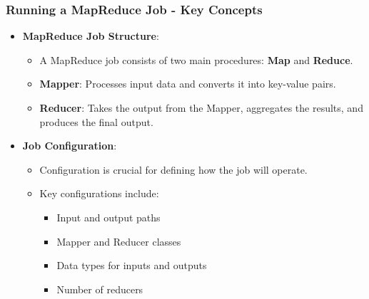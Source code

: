\documentclass[aspectratio=169]{beamer}
\begin{document}
\begin{frame}[fragile]
    \frametitle{Running a MapReduce Job - Key Concepts}
    \begin{itemize}
        \item \textbf{MapReduce Job Structure}:
            \begin{itemize}
                \item A MapReduce job consists of two main procedures: \textbf{Map} and \textbf{Reduce}.
                \item \textbf{Mapper}: Processes input data and converts it into key-value pairs.
                \item \textbf{Reducer}: Takes the output from the Mapper, aggregates the results, and produces the final output.
            \end{itemize}
        \item \textbf{Job Configuration}:
            \begin{itemize}
                \item Configuration is crucial for defining how the job will operate.
                \item Key configurations include:
                    \begin{itemize}
                        \item Input and output paths
                        \item Mapper and Reducer classes
                        \item Data types for inputs and outputs
                        \item Number of reducers
                    \end{itemize}
            \end{itemize}  
    \end{itemize}
\end{frame}
\end{document}
